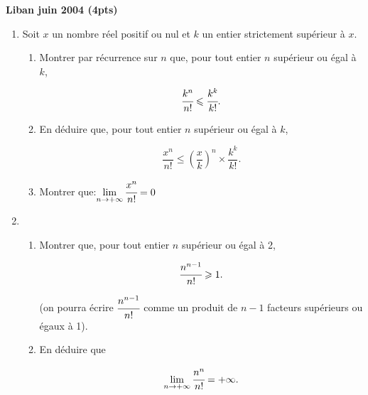 \begin{exercice}
{\large \textbf{  Liban juin 2004 (4pts)}}\\


\begin{enumerate} \item Soit $x$ un nombre r\'eel positif ou nul et $k$ un entier strictement sup\'erieur \`a $x$.

\begin{enumerate} \item Montrer par r\'ecurrence sur $n$ que, pour tout entier $n$ sup\'erieur ou \'egal \`a $k$,

\[ \cfrac{k^n}{ n!} \leqslant \cfrac{k^k}{k!}.\]

\item En d\'eduire que, pour tout entier $n$ sup\'erieur ou \'egal \`a  $k$,

\[ \dfrac{x^n}{ n!} \leqslant \left(\dfrac{x}{k} \right)^n \times \dfrac{k^k}{k!}.\]

\item Montrer que:$ \displaystyle\lim_{n \to + \infty} \cfrac{x^n}{ n!} = 0$

\end{enumerate}

 \item \begin{enumerate} \item Montrer que, pour tout entier $n$ sup\'erieur ou \'egal \`a 2,

\[\cfrac{n^{n-1}}{n!} \geqslant 1.\]

\noindent (on pourra \'ecrire $\cfrac{n^{n-1}}{n!}$ comme un produit de $n- 1$ facteurs sup\'erieurs
 ou \'egaux \`a 1).

\item En d\'eduire que

\[ \displaystyle\lim_{n \to + \infty} \cfrac{n^n}{ n!} = + \infty.\]

\end{enumerate}

\end{enumerate}
 
\end{exercice}
